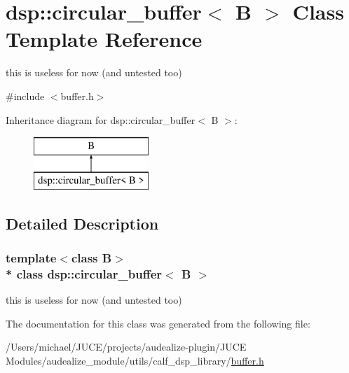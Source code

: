 \hypertarget{classdsp_1_1circular__buffer}{}\section{dsp\+:\+:circular\+\_\+buffer$<$ B $>$ Class Template Reference}
\label{classdsp_1_1circular__buffer}


this is useless for now (and untested too)  




{\ttfamily \#include $<$buffer.\+h$>$}

Inheritance diagram for dsp\+:\+:circular\+\_\+buffer$<$ B $>$\+:\begin{figure}[H]
\begin{center}
\leavevmode
\includegraphics[height=2.000000cm]{classdsp_1_1circular__buffer}
\end{center}
\end{figure}


\subsection{Detailed Description}
\subsubsection*{template$<$class B$>$\\*
class dsp\+::circular\+\_\+buffer$<$ B $>$}

this is useless for now (and untested too) 

The documentation for this class was generated from the following file\+:\begin{DoxyCompactItemize}
\item 
/\+Users/michael/\+J\+U\+C\+E/projects/audealize-\/plugin/\+J\+U\+C\+E Modules/audealize\+\_\+module/utils/calf\+\_\+dsp\+\_\+library/\hyperlink{buffer_8h}{buffer.\+h}\end{DoxyCompactItemize}

